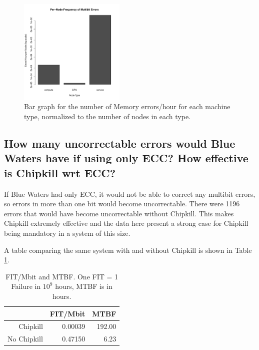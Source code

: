 \begin{figure}[h]
  \centering
  \includegraphics[width=0.45\textwidth]{images/task2_2_normed}
  \caption{Bar graph for the number of Memory errors/hour for each machine
  type, normalized to the number of nodes in each
  type.}\label{fig:mem_error_per_hr_normed}
\end{figure}

\subsection{How many uncorrectable errors would Blue Waters have if using only ECC? How effective is Chipkill wrt ECC?}

If Blue Waters had only ECC, it would not be able to correct any multibit
errors, so errors in more than one bit would become uncorrectable.  There were
1196 errors that would have become uncorrectable without Chipkill.  This makes
Chipkill extremely effective and the data here present a strong case for
Chipkill being mandatory in a system of this size.

A table comparing the same system with and without Chipkill is shown in Table
\ref{tab:mem_fit_mtbf}.
\begin{table}[ht]
\centering
  \begin{tabular}{rrr}
  \hline
  & FIT/Mbit & MTBF \\ 
  \hline
  Chipkill & 0.00039 & 192.00 \\ 
  No Chipkill & 0.47150 & 6.23 \\ 
  \hline
\end{tabular}
\caption{FIT/Mbit and MTBF. One FIT = 1 Failure in $10^9$ hours, MTBF is in
hours.}
\label{tab:mem_fit_mtbf}
\end{table}

